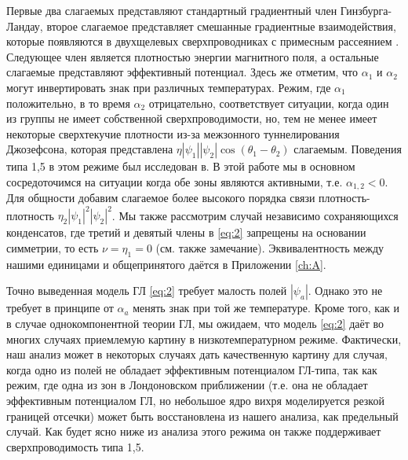 Первые два слагаемых представляют стандартный градиентный член 
Гинзбурга-Ландау, второе слагаемое представляет смешанные градиентные 
взаимодействия, которые появляются в двухщелевых сверхпроводниках с примесным 
рассеянием \cite{bib:8,bib:9}. Следующее член является плотностью энергии 
магнитного поля, а остальные слагаемые представляют эффективный потенциал. 
Здесь же отметим, что \( \alpha_1 \) и \( \alpha_2 \) могут инвертировать знак 
при различных температурах. Режим, где \( \alpha_1 \) положительно, в то время 
\( \alpha_2 \) отрицательно, соответствует ситуации, когда один из группы 
не имеет собственной сверхпроводимости, но, тем не менее имеет некоторые 
сверхтекучие плотности из-за межзонного туннелирования Джозефсона, которая 
представлена \( \eta|\psi_1||\psi_2|\cos(\theta_1-\theta_2) \) слагаемым. 
Поведения типа 1,5 в этом режиме был исследован в\cite{bib:2}. В этой работе 
мы в основном сосредоточимся на ситуации когда обе зоны являются активными, 
т.е. \( \alpha_{1,2} < 0 \). Для общности добавим слагаемое более высокого 
порядка связи плотность-плотность \( \eta_2|\psi_1|^2|\psi_2|^2 \). Мы также 
рассмотрим случай независимо сохраняющихся конденсатов, где третий и девятый 
члены в \eqref{eq:2} запрещены на основании симметрии, то есть 
\( \nu = \eta_1 = 0 \) (см. также замечание\cite{bib:21}). Эквивалентность 
между нашими единицами и общепринятого даётся в Приложении \ref{ch:A}.

Точно выведенная модель ГЛ \eqref{eq:2} требует малость полей \( |\psi_a| \). 
Однако это не требует в принципе от \( \alpha_a \) менять знак при той же 
температуре. Кроме того, как и в случае однокомпонентной теории ГЛ, мы 
ожидаем, что модель \eqref{eq:2} даёт во многих случаях приемлемую картину 
в низкотемпературном режиме. Фактически, наш анализ может в некоторых случаях 
дать качественную картину для случая, когда одно из полей не обладает 
эффективным потенциалом ГЛ-типа, так как режим, где одна из зон в Лондоновском 
приближении (т.е. она не обладает эффективным потенциалом ГЛ, но небольшое ядро 
вихря моделируется резкой границей отсечки) может быть восстановлена из 
нашего анализа, как предельный случай. Как будет ясно ниже из анализа этого 
режима он также поддерживает сверхпроводимость типа 1,5.

